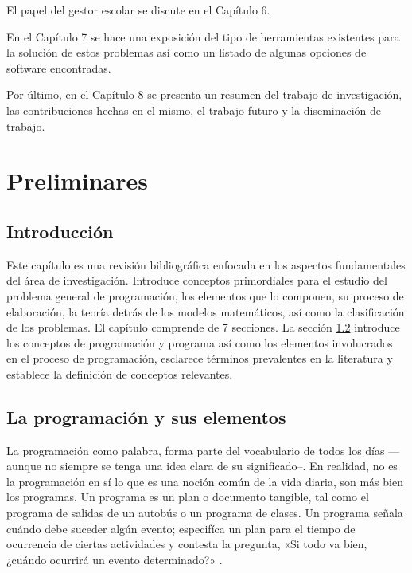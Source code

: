 \documentclass[draft,12pt,headsepline,footsepline,paper=letter]{scrreprt}
\begin{document}
El papel del gestor escolar se discute en el Capítulo 6.

En el Capítulo 7 se hace una exposición del tipo de herramientas existentes para la solución de estos problemas así como un listado de algunas opciones de software encontradas.

Por último, en el Capítulo 8 se presenta un resumen del trabajo de investigación, las contribuciones hechas en el mismo, el trabajo futuro y la diseminación de trabajo.

\chapter{Preliminares}
\label{preliminares}

\section{Introducción}
\label{introduccion_preliminares}

Este capítulo es una revisión bibliográfica enfocada en los aspectos fundamentales del área de investigación.
Introduce conceptos primordiales para el estudio del problema general de programación, los elementos que lo componen, su proceso de elaboración, la teoría detrás de los modelos matemáticos, así como la clasificación de los problemas.
El capítulo comprende de 7 secciones. La sección \ref{programacion_elementos} introduce los conceptos de programación y programa así como los elementos involucrados en el proceso de programación, esclarece términos prevalentes en la literatura y establece la definición de conceptos relevantes. 

\section{La programación y sus elementos} %
\label{programacion_elementos}

La programación como palabra, forma parte del vocabulario de todos los días —aunque no siempre se tenga una idea clara de su significado–. En realidad, no es la programación en sí lo que es una noción común de la vida diaria, son más bien los programas. Un programa es un plan o documento tangible, tal como el programa de salidas de un autobús o un programa de clases. Un programa señala cuándo debe suceder algún evento; especifíca un plan para el tiempo de ocurrencia de ciertas actividades y contesta la pregunta, «Si todo va bien, ¿cuándo ocurrirá un evento determinado?» \cite[p.~1]{Baker2009}.
\end{document}
